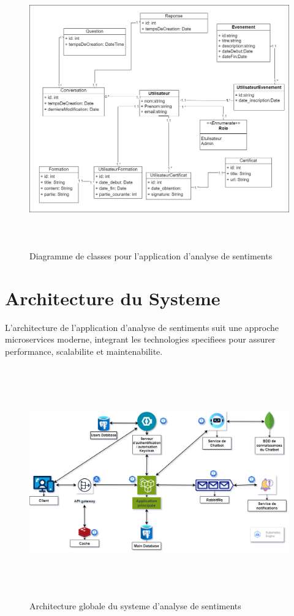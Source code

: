 \begin{figure}[H]
\centering
\includegraphics[height=12cm , width=\textwidth]{assets/images/class.png}
\caption{Diagramme de classes pour l'application d'analyse de sentiments}
\label{fig:class-global}
\end{figure}

\section{Architecture du Systeme}

L'architecture de l'application d'analyse de sentiments suit une approche microservices moderne, integrant les technologies specifiees pour assurer performance, scalabilite et maintenabilite.

\begin{figure}[H]
\centering
\includegraphics[height=10cm , width=\textwidth]{assets/images/architecture.png}
\caption{Architecture globale du systeme d'analyse de sentiments}
\label{fig:architecture}
\end{figure}

